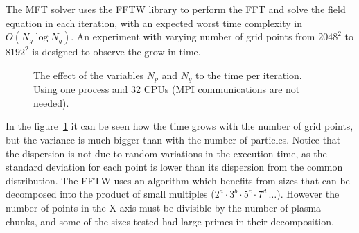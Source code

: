 The MFT solver uses the FFTW library to perform the FFT and solve the field 
equation in each iteration, with an expected worst time complexity in $O(N_g 
\log N_g)$. An experiment with varying number of grid points from $2048^2$ to 
$8192^2$ is designed to observe the grow in time.
%
\begin{figure}[h]%
	\centering
	\caption{The effect of the variables $N_p$ and $N_g$ to the time per 
	iteration. Using one process and 32 CPUs (MPI communications are not needed).}
	\label{fig:gridpoints-32cpus}
\end{figure}%
%
In the figure~\ref{fig:gridpoints-32cpus} it can be seen how the time grows with 
the number of grid points, but the variance is much bigger than with the number 
of particles. Notice that the dispersion is not due to random variations in the 
execution time, as the standard deviation for each point is lower than its 
dispersion from the common distribution. The FFTW uses an algorithm which 
benefits from sizes that can be decomposed into the product of small multiples 
($2^a \cdot 3^b\cdot 5^c\cdot 7^d\,\ldots$).  However the number of points in 
the X axis must be divisible by the number of plasma chunks, and some of the 
sizes tested had large primes in their decomposition.
%
%

